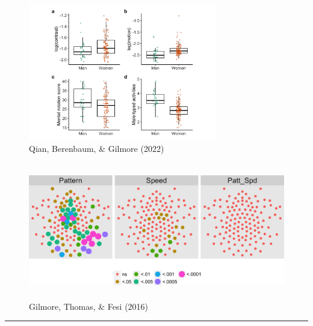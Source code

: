 \documentclass[
  letterpaper,
  DIV=11,
  numbers=noendperiod]{scrartcl}
\begin{document}
\begin{figure}[H]

{\centering \includegraphics[width=\linewidth,height=2.34375in,keepaspectratio]{img_gilmore_bio/qian-fig-01-boxplots-new.jpg}

}

\caption{Qian, Berenbaum, \& Gilmore (2022)}

\end{figure}%
\begin{figure}[H]

{\centering \includegraphics[width=\linewidth,height=2.34375in,keepaspectratio]{img_gilmore_bio/gilmore-thomas-fesi.png}

}

\caption{Gilmore, Thomas, \& Fesi (2016)}

\end{figure}%

\begin{center}\rule{0.5\linewidth}{0.5pt}\end{center}
\end{document}
